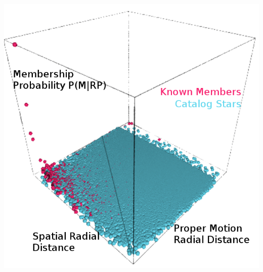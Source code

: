 \documentclass[32pt,portrait]{tikzposter}
\begin{document}
\begin{centering}
\begin{columns}
{\begin{tikzfigure}
      \includegraphics[scale=.8]{poster3dresize}
      \end{tikzfigure}
}
\end{columns}
\begin{columns}


\end{columns}
\end{centering}
\end{document}

